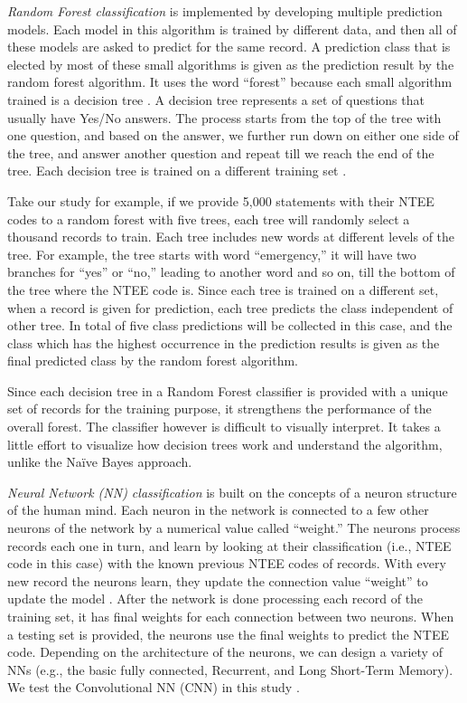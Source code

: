 \documentclass[11pt]{article}
\begin{document}
\textit{Random Forest classification} is implemented by developing multiple prediction models. Each model in this algorithm is trained by different data, and then all of these models are asked to predict for the same record. A prediction class that is elected by most of these small algorithms is given as the prediction result by the random forest algorithm. It uses the word ``forest'' because each small algorithm trained is a decision tree \parencites[83]{QuinlanInductiondecisiontrees1986}. A decision tree represents a set of questions that usually have Yes/No answers. The process starts from the top of the tree with one question, and based on the answer, we further run down on either one side of the tree, and answer another question and repeat till we reach the end of the tree. Each decision tree is trained on a different training set \parencites[124]{BreimanBaggingpredictors1996}. 

Take our study for example, if we provide 5,000 statements with their NTEE codes to a random forest with five trees, each tree will randomly select a thousand records to train. Each tree includes new words at different levels of the tree. For example, the tree starts with word ``emergency,'' it will have two branches for ``yes'' or ``no,'' leading to another word and so on, till the bottom of the tree where the NTEE code is. Since each tree is trained on a different set, when a record is given for prediction, each tree predicts the class independent of other tree. In total of five class predictions will be collected in this case, and the class which has the highest occurrence in the prediction results is given as the final predicted class by the random forest algorithm. 

Since each decision tree in a Random Forest classifier is provided with a unique set of records for the training purpose, it strengthens the performance of the overall forest. The classifier however is difficult to visually interpret. It takes a little effort to visualize how decision trees work and understand the algorithm, unlike the Na\"ive Bayes approach.

\textit{Neural Network (NN) classification} is built on the concepts of a neuron structure of the human mind. Each neuron in the network is connected to a few other neurons of the network by a numerical value called ``weight.'' The neurons process records each one in turn, and learn by looking at their classification (i.e., NTEE code in this case) with the known previous NTEE codes of records. With every new record the neurons learn, they update the connection value ``weight'' to update the model \parencites[163]{CollobertUnifiedArchitectureNatural2008}. After the network is done processing each record of the training set, it has final weights for each connection between two neurons. When a testing set is provided, the neurons use the final weights to predict the NTEE code. Depending on the architecture of the neurons, we can design a variety of NNs (e.g., the basic fully connected, Recurrent, and Long Short-Term Memory). We test the Convolutional NN (CNN) in this study \parencite{ZhangSensitivityAnalysisPractitioners2015}.
\end{document}
